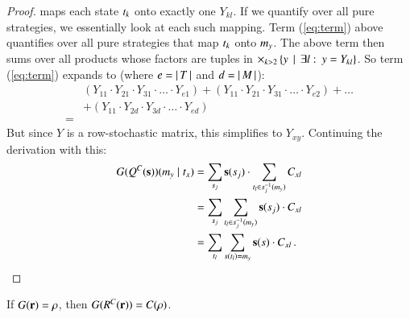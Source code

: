 \documentclass[fleqn,reqno,10pt]{article}
\renewcommand{\Smixed}{\ensuremath{\mathrm{\mathbf{s}}}}
\renewcommand{\Rmixed}{\ensuremath{\mathrm{\mathbf{r}}}}
\begin{document}
\begin{proof}
  maps each state $t_k$ onto exactly one $Y_{kl}$. If we quantify
  over all pure strategies, we essentially look at each such
  mapping. Term (\ref{eq:term}) above quantifies over all pure
  strategies that map $t_k$ onto $m_y$. The above term then
  sums over all products whose factors are tuples in $\times_{k>2}
  \left\{y \thinspace \mid \thinspace \exists l \thinspace \colon \thinspace y = Y_{kl}\right\}$. So term
  (\ref{eq:term}) expands to (where $e = \left \lvert \, T \, \right\rvert$ and $d=\left \lvert \, M \, \right\rvert$):
  \begin{align*}
    & (Y_{11} \cdot Y_{21} \cdot Y_{31} \cdot \ldots \cdot Y_{e1}) +
    (Y_{11} \cdot Y_{21} \cdot Y_{31} \cdot \ldots \cdot Y_{e2}) + 
    \dots \\
    & + (Y_{11} \cdot Y_{2d} \cdot
    Y_{3d} \cdot \ldots \cdot
    Y_{ed})\\
    = &    
  \end{align*}
  But since $Y$ is a row-stochastic matrix, this simplifies to
  $Y_{xy}$. Continuing the derivation with this:
  \begin{align*}
    G(Q^C(\Smixed))(\messg_y \probbar \state_x) 
    & = \sum_{\Spure_j} \Smixed(\Spure_j) \cdot
    \sum_{\state_l \in \Spure_j^{-1}(\messg_y)} C_{xl} \\
    & = \sum_{\Spure_j} \sum_{\state_l \in \Spure_j^{-1}(\messg_y)} \Smixed(\Spure_j) \cdot
     C_{xl} \\
     & = \sum_{\state_l}
    \sum_{\Spure(\state_l) = \messg_y} \Smixed(\Spure) \cdot C_{xl}\,.
  \end{align*}

\end{proof}

\begin{theorem}
  If $G(\Rmixed) = \Rstrat$, then $G(R^C(\Rmixed)) = C(\Rstrat)$.
\end{theorem}

\end{document}
